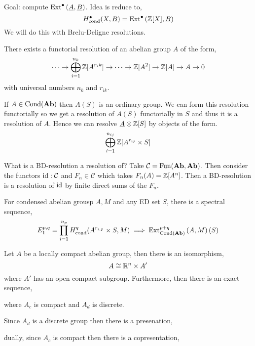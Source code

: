 \documentclass[12pt]{article}
\newcommand{\cond}{\text{cond}}
\newcommand{\Cond}{\mathrm{Cond}}
\renewcommand{\C}{\mathcal{C}}
\begin{document}
\renewcommand{\u}{\underline}
\newcommand{\Fun}{\mathrm{Fun}}

Goal: compute $\Ext{\bullet}{}{\u{A}}{\u{B}}$. Idea is reduce to,
\[ H^\bullet_{\cond}(X, \u{B}) = \Ext{\bullet}{}{\Z[X]}{\u{B}} \]
We will do this with Brelu-Deligne resolutions.

\begin{theorem}
There exists a functorial resolution of an abelian group $A$ of the form,
\[ \cdots \to \bigoplus_{i = 1}^{n_k} \mathbb{Z}[A^{r_ik}] \to \cdots \to \mathbb{Z}[A^2] \to \mathbb{Z}[A] \to A \to 0 \]
with universal numbers $n_k$ and $r_{ik}$.
\end{theorem}

If $A \in \Cond(\Ab)$ then $A(S)$ is an ordinary group. We can form this resolution functorially so we get a resolution of $A(S)$ functorially in $S$ and thus it is a resolution of $A$. Hence we can resolve $\u{A} \ot \Z[S]$ by objects of the form.
\[ \bigoplus_{i = 1}^{n_{ij}} \mathbb{Z}[A^{r_{ij}} \times S] \]

\begin{rmk}
What is a BD-resolution a resolution of? Take $\C = \Fun(\Ab, \Ab)$. Then consider the functors $\id : \C$ and $F_n \in \C$ which takes $F_n(A) = \mathbb{Z}[A^n]$. Then a BD-resolution is a resolution of $\mathrm{id}$ by finite direct sums of the $F_n$. 
\end{rmk}

\begin{cor}
For condensed abelian grousp $A,M$ and any ED set $S$, there is a spectral sequence,
\[ E^{p,q}_1 = \prod_{i = 1}^{n_p} H^q_{\cond}(A^{r_{i, p}} \times S, M) \implies \Ext{p+q}{\Cond(\Ab)}{A}{M}(S) \]
\end{cor}


\begin{prop}
Let $A$ be a locally compact abelian group, then there is an isomorphism,
\[ A \cong \mathbb{R}^n \times A' \] 
where $A'$ has an open compact subgroup. Furthermore, then there is an exact sequence,
\begin{center}
\end{center}
where $A_c$ is compact and $A_d$ is discrete. 
\end{prop}

\begin{rmk}
Since $A_d$ is a discrete group then there is a presenation,
\begin{center}
\end{center}
dually, since $A_c$ is compact then there is a copresentation,
\begin{center}
\end{center}
\end{rmk}
\end{document}
